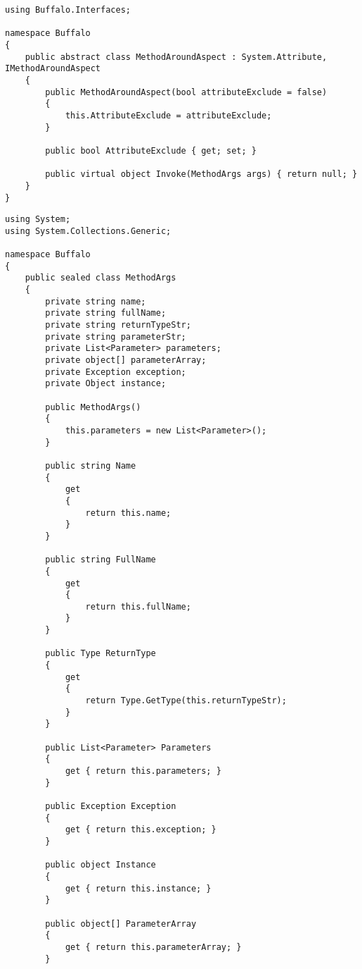 \begin{lstlisting}[caption={../buffalo/MethodAroundAspect.cs}, label=../buffalo/MethodAroundAspect.cs, frame=tb, basicstyle=\scriptsize]﻿using Buffalo.Interfaces;

namespace Buffalo
{
    public abstract class MethodAroundAspect : System.Attribute, IMethodAroundAspect
    {
        public MethodAroundAspect(bool attributeExclude = false)
        {
            this.AttributeExclude = attributeExclude;
        }

        public bool AttributeExclude { get; set; }

        public virtual object Invoke(MethodArgs args) { return null; }
    }
}
\end{lstlisting}

\begin{lstlisting}[caption={../buffalo/MethodArgs.cs}, label=../buffalo/MethodArgs.cs, frame=tb, basicstyle=\scriptsize]﻿using System;
using System.Collections.Generic;

namespace Buffalo
{
    public sealed class MethodArgs
    {
        private string name;
        private string fullName;
        private string returnTypeStr;
        private string parameterStr;
        private List<Parameter> parameters;
        private object[] parameterArray;
        private Exception exception;
        private Object instance;

        public MethodArgs()
        {
            this.parameters = new List<Parameter>();
        }

        public string Name
        {
            get
            {
                return this.name;
            }
        }

        public string FullName
        {
            get
            {
                return this.fullName;
            }
        }

        public Type ReturnType
        {
            get
            {
                return Type.GetType(this.returnTypeStr);
            }
        }

        public List<Parameter> Parameters
        {
            get { return this.parameters; }
        }

        public Exception Exception
        {
            get { return this.exception; }
        }

        public object Instance
        {
            get { return this.instance; }
        }

        public object[] ParameterArray
        {
            get { return this.parameterArray; }
        }


\end{lstlisting}
